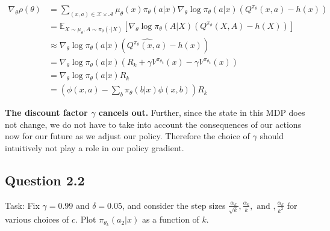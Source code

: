\documentclass[a4paper, 11pt]{article} %
\begin{document}
\begin{align} \nabla_{\theta} \rho(\theta)
&=\sum_{(x, a) \in \mathcal{X} \times \mathcal{A}} \mu_{\theta}(x) \pi_{\theta}(a | x) \nabla_{\theta} \log \pi_{\theta}(a | x)\left(Q^{\pi_\theta}(x, a)-h(x)\right) \\
&=\mathbb{E}_{X \sim \mu_{\theta}, A \sim \pi_{\theta}(\cdot | X)}\left[\nabla_{\theta} \log \pi_{\theta}(A | X)\left(Q^{\pi_{\theta}}(X, A)-h(X)\right)\right] \\
&\approx \nabla_{\theta} \log \pi_{\theta}(a | x)  \left(\widehat{Q^{\pi_{\theta}}(x, a)}-h(x)\right) \\
&=\nabla_{\theta} \log \pi_{\theta}(a | x)  \left(R_{k}+\gamma V^{\pi_{\theta_{k}}}(x) - \gamma V^{\pi_{\theta_{k}}}(x)\right) \\
&=\nabla_{\theta} \log \pi_{\theta}(a | x)  R_{k} \\
&=\left(  \phi(x, a)-\sum_{b} \pi_{\theta}(b|x) \phi(x, b)\right)R_{k}
\end{align}

\textbf{The discount factor $\gamma$ cancels out.} Further, since the state in this MDP does not change, we do not have to take into account the consequences of our actions now for our future as we adjust our policy. Therefore the choice of  $\gamma$ should intuitively not play a role in our policy gradient.

\subsection*{Question 2.2}

Task: Fix $\gamma = 0.99$ and $\delta = 0.05$, and consider the step sizes $\frac{\alpha_{k}}{\sqrt{k}} ,\frac{\alpha_{k}}{k}, \text { and },\frac{\alpha_{k}}{k^{2}}$ for various choices of $c$. Plot $\pi_{\theta_{k}}(a_{2}|x)$ as a function of $k$. \\
\end{document}
